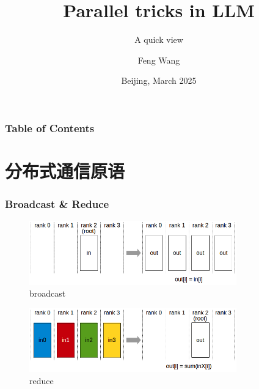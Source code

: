 \documentclass{beamer}
\title[Parallel tricks in LLM] %
{Parallel tricks in LLM}
\subtitle{A quick view}
\author[Feng Wang] %
{Feng Wang\inst{1}}
\institute[baichuan] %
{
  \inst{1}%
  Baichuan\\
  wangfeng19950315@163.com
}
\date[beijing 2025] %
{Beijing, March 2025}
\begin{document}
\frame{\titlepage}


\begin{frame}
    \frametitle{Table of Contents}
    \tableofcontents
\end{frame}


\section{分布式通信原语}

\begin{frame}[fragile]
\frametitle{Broadcast \& Reduce}

\begin{figure}[h]
    \centering
    \includegraphics[width=0.8\textwidth]{broadcast.png}
    \captionsetup{labelformat=empty}
    \caption{broadcast}
\end{figure}

\begin{figure}[h]
    \centering
    \includegraphics[width=0.8\textwidth]{reduce.png}
    \captionsetup{labelformat=empty}
    \caption{reduce}
\end{figure}


\end{frame}
\end{document}
